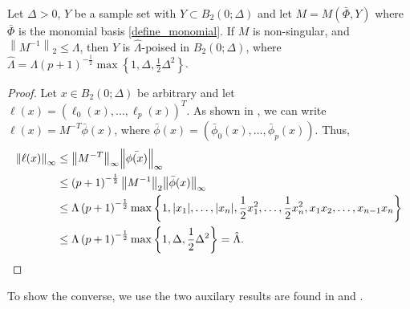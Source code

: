 \documentclass{article}
\begin{document}
\begin{theorem}
\label{Lambda_poised_error_bounds_delta}

Let $\Delta >0$, $Y$ be a sample set with $Y \subset B_2(0;\Delta)$ and let $M=M(\bar{\Phi},Y)$ where $\bar{\Phi}$ is the monomial basis \cref{define_monomial}.
If $M$ is non-singular, and $\left\|{M^{-1}}\right\|_2 \le \Lambda$, then $Y$ is $\hat{\Lambda}$-poised in $B_2(0;\Delta)$,
where $\hat{\Lambda} = \Lambda \left(p+1\right)^{-\frac 1 2}\max\left\{1, \Delta, \frac 1 2 \Delta^2\right\}$.
\end{theorem}

\begin{proof}

Let $x \in B_2(0;\Delta)$ be arbitrary and let $\ell(x) = (\ell_0(x), \ldots, \ell_p(x))^T$.
As shown in \cite{introduction_book}, we can write $\ell(x) = M^{-T}\bar{\phi}(x)$, 
where $\bar{\phi}(x) = (\bar{\phi}_0(x), \ldots, \bar{\phi}_p(x))$.
Thus,
\begin{align*}
{\left\|\ell(x)\right\|}_{\infty} & \le {\left\|M^{-T}\right\|}_{\infty} {\left\|\bar{\phi(x)}\right\|}_{\infty} \\
& \le \left(p+1\right)^{-\frac 1 2} {\left\|M^{-1}\right\|}_2 {\left\|\bar{\phi}(x)\right\|}_{\infty} \\
& \le \Lambda \left(p+1\right)^{-\frac 1 2} \max\left\{1, |x_1|, \ldots,|x_n|, \frac 1 2 x_1^2, \ldots, \frac 1 2 x_n^2, x_1x_2, \ldots, x_{n-1}x_n\right\}\\
& \le \Lambda \left(p+1\right)^{-\frac 1 2}  \max\left\{1, \Delta, \frac 1 2 \Delta^2\right\} = \hat{\Lambda}.
\end{align*}

\end{proof}


To show the converse, we use the two auxilary results are found in \cite[Lemma 3.10]{introduction_book} and \cite[Lemma 3.13]{introduction_book}.

\end{document}
